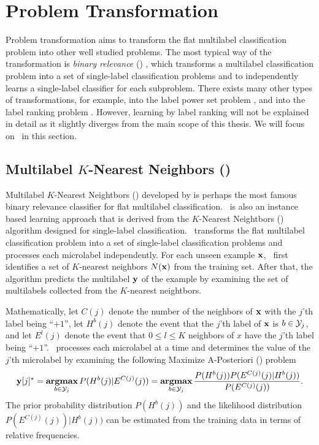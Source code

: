 {%
%
\section{Problem Transformation}

Problem transformation aims to transform the flat multilabel classification problem into other well studied problems.
The most typical way of the transformation is \textit{binary relevance} (\br) \citep{Tsoumakas07multi,Tsoumakas10mining}, which transforms a multilabel classification problem into a set of single-label classification problems and to independently learns a single-label classifier for each subproblem.
There exists many other types of transformations, for example, into the label power set problem \citep{Tsoumakas07random}, and into the label ranking problem \citep{Elisseeff01akernel,Brinker07case,Furnkranz08multilabel,Chiang12a}.
However, learning by label ranking will not be explained in detail as it slightly diverges from the main scope of this thesis.
We will focus on \br\ in this section.



%
%
\subsection{Multilabel $K$-Nearest Neighbors (\mlknn)} \label{sc_mlknn}

Multilabel $K$-Nearest Neightbors (\mlknn) developed by \citet{Zhang05a,Zhang07mlknn} is perhaps the most famous binary relevance classifier for flat multilabel classification.
\mlknn\ is also an instance based learning approach \citep{Aha91instance} that is derived from the $K$-Nearest Neightbors (\knn) algorithm designed for single-label classification.
\mlknn\ transforms the flat multilabel classification problem into a set of single-label classification problems and processes each microlabel independently.
For each unseen example $\mathbf {x}$, \mlknn\ first identifies a set of $K$-nearest neighbors $N(\mathbf {x})$ from the training set.
After that, the algorithm predicts the multilabel $\mathbf {y}$ of the example by examining the set of multilabels collected from the $K$-nearest neightbors.

Mathematically,
let $C(j)$ denote the number of the neighbors of $\mathbf {x}$ with the $j$'th label being ``$+1$'',
let $H^b(j)$ denote the event that the $j$'th label of $\mathbf {x}$ is $b\in\mathcal{Y}_j$,
and let $E^l(j)$ denote the event that $0\le l \le K$ neighbors of $x$ have the $j$'th label being ``$+1$''.
\mlknn\ processes each microlabel at a time and determines the value of the $j$'th microlabel by examining the following Maximize A-Posteriori (\map) problem
\begin{align*}
	\mathbf {y}[j]^* = \underset{b\in\mathcal{Y}_j}{\textbf{argmax}} \, P( H^b(j) | E^{C(j)}(j) )
	= \underset{b\in\mathcal{Y}_j}{\textbf{argmax}} \, \frac{P( H^b(j) ) P(  E^{C(j)}(j)  | H^b(j))}{P(E^{C(j)}(j))}.
\end{align*}
The prior probability distribution $P(H^b(j))$ and the likelihood distribution $P(  E^{C(j)}(j) ) | H^b(j))$ can be estimated from the training data in terms of relative frequencies.

}

